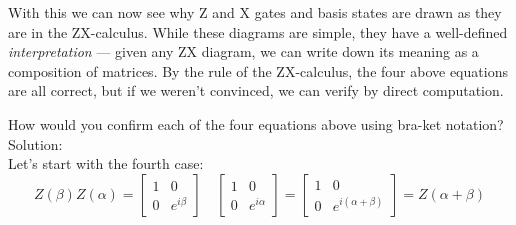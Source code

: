 \documentclass{article}
\newcommand{\soln}{{\\[1em] \hspace{-1em}\color{greentitle}\sffamily\large Solution: \\[0.5em]}}
\theoremstyle{definition}
\begin{document}
With this we can now see why Z and X gates and basis states are drawn as they are in the ZX-calculus.
While these diagrams are simple, they have a well-defined \textit{interpretation} --- given any ZX diagram, we can write down its meaning as a composition of matrices.
By the rule of the ZX-calculus, the four above equations are all correct, but if we weren't convinced, we can verify by direct computation.
\begin{example}
	How would you confirm each of the four equations above using bra-ket notation?
	\soln \textnormal{Let's start with the fourth case:}
	\begin{equation}
		Z(\beta) Z(\alpha) = \begin{bmatrix}
			1 & 0\\
			0 & e^{i \beta}
		\end{bmatrix} \quad \begin{bmatrix}
			1 & 0\\
			0 & e^{i \alpha}
		\end{bmatrix} = \begin{bmatrix}
			1 & 0\\
			0 & e^{i (\alpha + \beta)}
		\end{bmatrix} = Z(\alpha + \beta)
	\end{equation}


\end{example}
\end{document}

